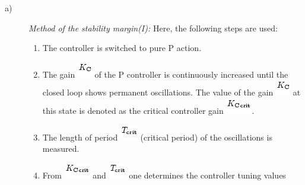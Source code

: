 \documentclass[]{article}
\providecommand{\tightlist}{%
  \setlength{\itemsep}{0pt}\setlength{\parskip}{0pt}}
\begin{document}
\begin{description}
\item[a)]
\emph{\protect\hypertarget{16278}{}{}Method of the stability margin(I):}
Here, the following steps are used:

\begin{enumerate}
\tightlist
\item
  The controller is switched to pure P action.
\item
  The gain
  \includegraphics[width=0.25000in,height=0.27083in]{./Empirical tuning rules according to Ziegler and Nichols_files/img1108.png}
  of the P controller is continuously increased until the closed loop
  shows permanent oscillations. The value of the gain
  \includegraphics[width=0.25000in,height=0.27083in]{./Empirical tuning rules according to Ziegler and Nichols_files/img1108.png}
  at this state is denoted as the
  \protect\hypertarget{16282}{}{}\protect\hypertarget{16283}{}{}critical
  controller gain
  \includegraphics[width=0.44792in,height=0.27083in]{./Empirical tuning rules according to Ziegler and Nichols_files/img1246.png}.
\item
  The length of period
  \includegraphics[width=0.30208in,height=0.27083in]{./Empirical tuning rules according to Ziegler and Nichols_files/img1247.png}
  \protect\hypertarget{16286}{}{}
  \protect\hypertarget{16287}{}{}(critical period) of the oscillations
  is measured.
\item
  From
  \includegraphics[width=0.44792in,height=0.27083in]{./Empirical tuning rules according to Ziegler and Nichols_files/img1246.png}
  and
  \includegraphics[width=0.30208in,height=0.27083in]{./Empirical tuning rules according to Ziegler and Nichols_files/img1247.png}
  one determines the controller tuning values

\end{enumerate}
\end{description}
\end{document}
